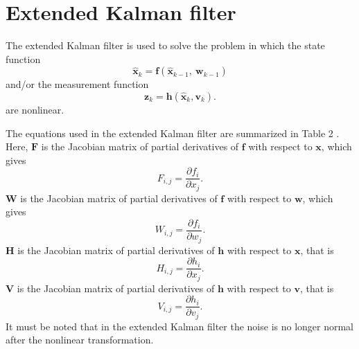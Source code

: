 \documentclass[12pt]{article}
\begin{document}

\section{Extended Kalman filter}\label{extended-kalman-filter}

The extended Kalman filter is used to solve the problem in which the state function
%
\begin{equation}
	\mathbf{\hat{x}}_{k} = \mathbf{f}( \mathbf{\hat{x}}_{k - 1},\ \mathbf{w}_{k - 1})
\end{equation}
and/or the measurement function
%
\begin{equation}
	\mathbf{z}_{k} = \mathbf{h}( \mathbf{\hat{x}}_{k},\mathbf{v}_{k}).
\end{equation}
%
are nonlinear.

The equations used in the extended Kalman filter are summarized in Table 2 \cite{Welch}. Here, \(\mathbf{F}\) is the Jacobian matrix of partial derivatives of \(\mathbf{f}\) with respect to \(\mathbf{x}\), which gives
%
\begin{equation}
	F_{i,j} = \frac{\partial f_{i}}{\partial x_{j}}.
\end{equation}
%
\(\mathbf{W}\) is the Jacobian matrix of partial derivatives of \(\mathbf{f}\) with respect to \(\mathbf{w}\), which gives
%
\begin{equation}
	W_{i,j} = \frac{\partial f_{i}}{\partial w_{j}}.
\end{equation}
%
\(\mathbf{H}\) is the Jacobian matrix of partial derivatives of \(\mathbf{h}\) with respect to \(\mathbf{x}\), that is
%
\begin{equation}
	H_{i,j} = \frac{\partial h_{i}}{\partial x_{j}}.
\end{equation}
%
\(\mathbf{V}\) is the Jacobian matrix of partial derivatives of \(\mathbf{h}\) with respect to \(\mathbf{v}\), that is
%
\begin{equation}
	V_{i,j} = \frac{\partial h_{i}}{\partial v_{j}}.
\end{equation}
%
It must be noted that in the extended Kalman filter the noise is no
longer normal after the nonlinear transformation.
\end{document}
